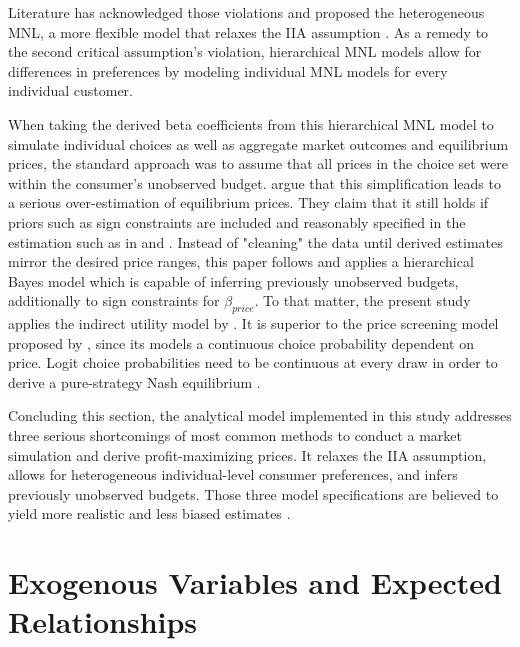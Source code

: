 \documentclass[12pt,a4paper]{article}
\begin{document}
Literature has acknowledged those violations and proposed the heterogeneous MNL, a more flexible model that relaxes the IIA assumption \citep{steckelHeterogeneousConditionalLogit1988}.
As a remedy to the second critical assumption's violation, hierarchical MNL models allow for differences in preferences by modeling individual MNL models for every individual customer.

When taking the derived beta coefficients from this hierarchical MNL model to simulate individual choices as well as aggregate market outcomes and equilibrium prices,
the standard approach was to assume that all prices in the choice set were within the consumer's unobserved budget.
\cite{pachaliPerilsIgnoringBudget2017} argue that this simplification leads to a serious over-estimation of equilibrium prices.
They claim that it still holds if priors such as sign constraints are included and reasonably specified in the estimation such as in \cite{sonnierHeterogeneityDistributionsWillingnesstopay2007} and \cite{allenbyEconomicValuationProduct2014}.
Instead of "cleaning" the data until derived estimates mirror the desired price ranges, this paper follows \cite{pachaliPerilsIgnoringBudget2017}
and applies a hierarchical Bayes model which is capable of inferring previously unobserved budgets, additionally to sign constraints for $\beta_{price}$.
To that matter, the present study applies the indirect utility model by \cite{berryAutomobilePricesMarket1995}.
It is superior to the price screening model proposed by \cite{gilbrideChoiceModelConjunctive2004},
since its models a continuous choice probability dependent on price.
Logit choice probabilities need to be continuous at every draw in order to derive a pure-strategy Nash equilibrium \citep{morrowFixedPointApproachesComputing2011a, pachaliPerilsIgnoringBudget2017}.

Concluding this section, the analytical model implemented in this study addresses three serious shortcomings of most common methods to conduct a market simulation and derive profit-maximizing prices.
It relaxes the IIA assumption, allows for heterogeneous individual-level consumer preferences, and infers previously unobserved budgets.
Those three model specifications are believed to yield more realistic and less biased estimates \citep{chandukalaChoiceModelsMarketing2008, pachaliPerilsIgnoringBudget2017}.


\section{Exogenous Variables and Expected Relationships}
\end{document}
